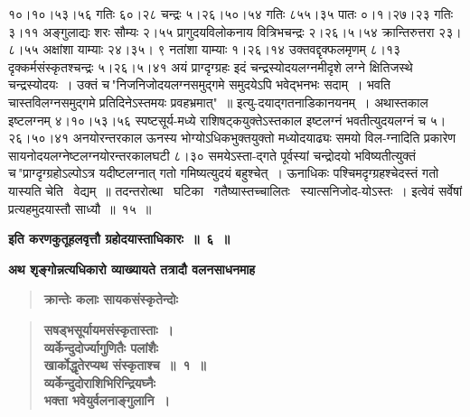 \documentclass[11pt, openany]{book}
\begin{document}
\newpage

\noindent १०।१०।५३।५६ गतिः ६०।२८ चन्द्रः ५।२६।५०।५४ गतिः ८५५।३५ पातः ०।१।२७।२३ गतिः ३।११ अङ्गुलाद्यः शरः सौम्यः २।५५ प्रागुदयविलोकनाय वित्रिभचन्द्रः २।२६।५।५४ क्रान्तिरुत्तरा २३।८।५५ अक्षांशा याम्याः २४।३५। ९ नतांशा याम्याः १।२६।१४ उक्तवद्दृक्फलमृणम् ८।१३ दृक्कर्मसंस्कृतश्चन्द्रः ५।२६।५।४१ \;अयं \;प्राग्दृग्ग्रहः \;इदं \;चन्द्रस्योदयलग्नमीदृशे \;लग्ने \;क्षितिजस्थे चन्द्रस्योदयः~। उक्तं च\textendash \,{\color{violet}"निजनिजोदयलग्नसमुद्गमे समुदयेऽपि भवेद्भनभः सदाम्~। भवति चास्तविलग्नसमुद्गमे प्रतिदिनेऽस्तमयः प्रवहभ्रमात्"~॥} इत्यु-दयाद्गतनाडिकानयनम्~। अथास्तकाल इष्टलग्नम् ४।१०।५३।५६ स्पष्टसूर्य-मध्ये \;राशिषट्कयुक्तेऽस्तकाल \;इष्टलग्नं \;भवतीत्युदयलग्नं \;च \;५।२६।५०।४१ अनयोरन्तरकाल ऊनस्य भोग्योऽधिकभुक्तयुक्तो मध्योदयाढ्यः समयो विल-ग्नादिति प्रकारेण सायनोदयलग्नेष्टलग्नयोरन्तरकालघटी ८।३० समयेऽस्ता-द्गते पूर्वस्यां चन्द्रोदयो भविष्यतीत्युक्तं च\textendash \,{\color{violet}"प्राग्दृग्ग्रहोऽल्पोऽत्र यदीष्टलग्नात् गतो गमिष्यत्युदयं बहुश्चेत्~। ऊनाधिकः पश्चिमदृग्ग्रहश्चेदस्तं गतो यास्यति चेति ~वेद्यम्~॥ \;तदन्तरोत्था ~घटिका ~गतैष्यास्तच्चालितः ~स्यात्सनिजोद-योऽस्तः~।} इत्वेवं सर्वेषां प्रत्यहमुदयास्तौ साध्यौ~॥~१५~॥

\begin{center}
{\large \textbf{इति करणकुतूहलवृत्तौ ग्रहोदयास्ताधिकारः~॥~६~॥}}
\end{center}
\vspace{2mm}

{\small \textbf{अथ शृङ्गोन्नत्यधिकारो व्याख्यायते तत्रादौ वलनसाधनमाह\textendash }}

 \label{7.1.1}
\begin{quote}
{\large \textbf{{\color{purple}क्रान्तेः कलाः सायकसंस्कृतेन्दोः}}}
\end{quote}

\newpage

 \label{7.1}
\begin{quote}
{\large \textbf{{\color{purple}सषड्भसूर्यायमसंस्कृतास्ताः~।\\
व्यर्केन्दुदोर्ज्यागुणितैः पलांशैः \\
खार्कोद्धृतेरप्यथ संस्कृताश्च~॥~१~॥ \\
व्यर्केन्दुदोराशिभिरिन्द्रियघ्नैः \\
भक्ता भवेयुर्वलनाङ्गुलानि~।}}}
\end{quote}
\end{document}

